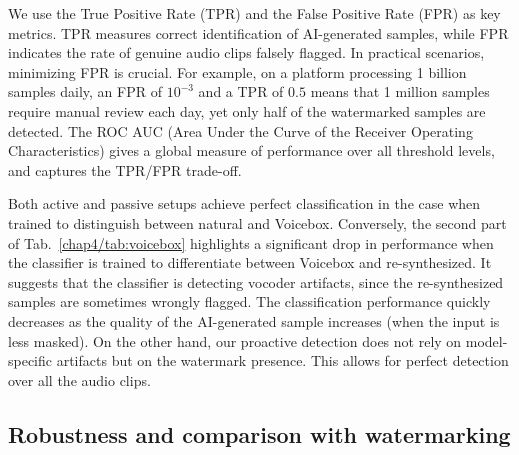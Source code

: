 We use the True Positive Rate (\Gls*{TPR}) and the False Positive Rate (\Gls*{FPR}) as key metrics.
TPR measures correct identification of AI-generated samples, while FPR indicates the rate of genuine audio clips falsely flagged.
In practical scenarios, minimizing FPR is crucial. 
For example, on a platform processing 1 billion samples daily, an FPR of $10^{-3}$ and a TPR of $0.5$ means that 1 million samples require manual review each day, yet only half of the watermarked samples are detected.
The \Gls*{ROC} AUC (Area Under the Curve of the Receiver Operating Characteristics) gives a global measure of performance over all threshold levels, and captures the TPR/FPR trade-off.

Both active and passive setups achieve perfect classification in the case when trained to distinguish between natural and Voicebox.
Conversely, the second part of Tab.~\ref{chap4/tab:voicebox} highlights a significant drop in performance when the classifier is trained to differentiate between Voicebox and re-synthesized.
It suggests that the classifier is detecting vocoder artifacts, since the re-synthesized samples are sometimes wrongly flagged.
The classification performance quickly decreases as the quality of the AI-generated sample increases (when the input is less masked).
On the other hand, our proactive detection does not rely on model-specific artifacts but on the watermark presence. %
This allows for perfect detection over all the audio clips. %




\subsection{Robustness and comparison with watermarking}

